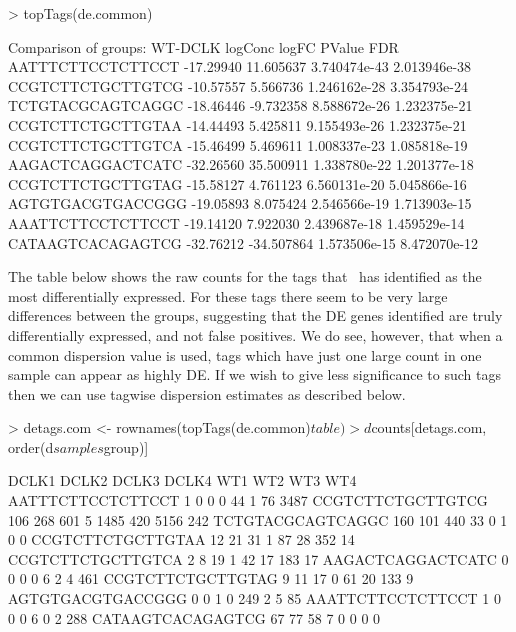 \begin{Schunk}
\begin{Sinput}
> topTags(de.common)
\end{Sinput}
\begin{Soutput}
Comparison of groups: WT-DCLK 
                    logConc      logFC       PValue          FDR
AATTTCTTCCTCTTCCT -17.29940  11.605637 3.740474e-43 2.013946e-38
CCGTCTTCTGCTTGTCG -10.57557   5.566736 1.246162e-28 3.354793e-24
TCTGTACGCAGTCAGGC -18.46446  -9.732358 8.588672e-26 1.232375e-21
CCGTCTTCTGCTTGTAA -14.44493   5.425811 9.155493e-26 1.232375e-21
CCGTCTTCTGCTTGTCA -15.46499   5.469611 1.008337e-23 1.085818e-19
AAGACTCAGGACTCATC -32.26560  35.500911 1.338780e-22 1.201377e-18
CCGTCTTCTGCTTGTAG -15.58127   4.761123 6.560131e-20 5.045866e-16
AGTGTGACGTGACCGGG -19.05893   8.075424 2.546566e-19 1.713903e-15
AAATTCTTCCTCTTCCT -19.14120   7.922030 2.439687e-18 1.459529e-14
CATAAGTCACAGAGTCG -32.76212 -34.507864 1.573506e-15 8.472070e-12
\end{Soutput}
\end{Schunk}

The table below shows the raw counts for the tags that \edgeR~has
identified as the most differentially expressed. For these tags there
seem to be very large differences between the groups, suggesting that
the DE genes identified are truly differentially expressed, and not
false positives. We do see, however, that when a common dispersion
value is used, tags which have just one large count in one sample can
appear as highly DE. If we wish to give less significance to such tags
then we can use tagwise dispersion estimates as described below.

\begin{Schunk}
\begin{Sinput}
> detags.com <- rownames(topTags(de.common)$table)
> d$counts[detags.com, order(d$samples$group)]
\end{Sinput}
\begin{Soutput}
                  DCLK1 DCLK2 DCLK3 DCLK4  WT1 WT2  WT3  WT4
AATTTCTTCCTCTTCCT     1     0     0     0   44   1   76 3487
CCGTCTTCTGCTTGTCG   106   268   601     5 1485 420 5156  242
TCTGTACGCAGTCAGGC   160   101   440    33    0   1    0    0
CCGTCTTCTGCTTGTAA    12    21    31     1   87  28  352   14
CCGTCTTCTGCTTGTCA     2     8    19     1   42  17  183   17
AAGACTCAGGACTCATC     0     0     0     0    6   2    4  461
CCGTCTTCTGCTTGTAG     9    11    17     0   61  20  133    9
AGTGTGACGTGACCGGG     0     0     1     0  249   2    5   85
AAATTCTTCCTCTTCCT     1     0     0     0    6   0    2  288
CATAAGTCACAGAGTCG    67    77    58     7    0   0    0    0
\end{Soutput}
\end{Schunk}

